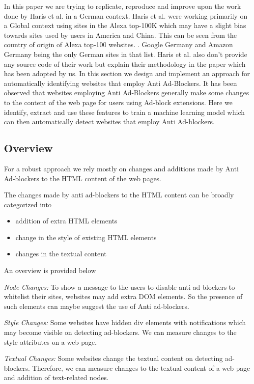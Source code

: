 \documentclass[runningheads,a4paper]{llncs}
\begin{document}
In this paper we are trying to replicate, reproduce and improve upon the work done by Haris et al. \cite{Haris2015} in a German context. 
Haris et al. were working primarily on a Global context using sites in the Alexa top-100K which may have a slight bias towards sites used by users in America and China. 
This can be seen from the country of origin of Alexa top-100 websites. \cite{Top-100}. 
Google Germany and Amazon Germany being the only German sites in that list. Haris et al. also don't provide any source code of their work but explain their methodology in the paper which has been adopted by us. 
In this section we design and implement an approach for automatically identifying websites that employ Anti Ad-Blockers. It has been observed that websites employing Anti Ad-Blockers generally make some changes to the content of the web page for users using Ad-block extensions. Here we identify, extract and use these features to train a machine learning model which can then automatically detect websites that employ Anti Ad-blockers.

\subsection{Overview}

For a robust approach we rely mostly on changes and additions made by Anti Ad-blockers to the HTML content of the web pages.

The changes made by anti ad-blockers to the HTML content can be broadly categorized into
\begin{itemize}
\item{addition of extra HTML elements}
\item{change in the style of existing HTML elements}
\item{changes in the textual content}
\end{itemize}
An overview is provided below

\textit{Node Changes:} To show a message to the users to disable anti ad-blockers to whitelist their sites, websites may add extra DOM elements. So the presence of such elements can maybe suggest the use of Anti ad-blockers.

\textit{Style Changes:} Some websites have hidden div elements with notifications which may become visible on detecting ad-blockers. We can measure changes to the style attributes on a web page.

\textit{Textual Changes:} Some websites change the textual content on detecting ad-blockers. Therefore, we can measure changes to the textual content of a web page and addition of text-related nodes.
\end{document}

